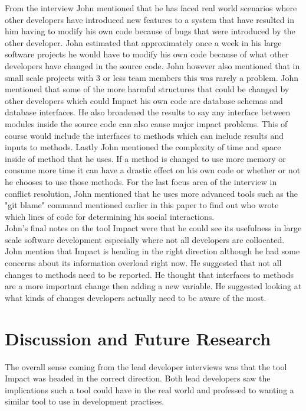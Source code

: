 \documentclass[conference]{IEEEtran}
\begin{document}
From the interview John mentioned that he has faced real world scenarios where other developers
have introduced new features to a system that have resulted in him having to modify his own code
because of bugs that were introduced by the other developer. John estimated that approximately
once a week in his large software projects he would have to modify his own code because of what
other developers have changed in the source code. John however also mentioned that in small scale projects with 3
or less team members this was rarely a problem. John mentioned that some of the more harmful 
structures that could be changed by other developers which could Impact his own code are database schemas
and database interfaces. He also broadened the results to say any interface between modules
inside the source code can also cause major impact problems.  This of course would include the interfaces
to methods which can include results and inputs to methods. Lastly John mentioned the complexity
of time and space inside of method that he uses. If a method is changed to use more memory or
consume more time it can have a drastic effect on his own code or whether or not he chooses to
use those methods. For the last focus area of the interview in conflict resolution, John mentioned 
that he uses more advanced tools such as the "git blame" command mentioned earlier in this paper
to find out who wrote which lines of code for determining his social interactions.\\

John's final notes on the tool Impact were that he could see its usefulness in large scale software
development especially where not all developers are collocated. John mention that Impact is
heading in the right direction although he had some concerns about its information overload
right now. He suggested that not all changes to methods need to be reported. He thought that
interfaces to methods are a more important change then adding a new variable. He suggested
looking at what kinds of changes developers actually need to be aware of the most.\\


\section{Discussion and Future Research}
The overall sense coming from the lead developer interviews was that the tool Impact was 
headed in the correct direction. Both lead developers saw the implications such a tool
could have in the real world and professed to wanting a similar tool to use in development
practises.\\
\end{document}
